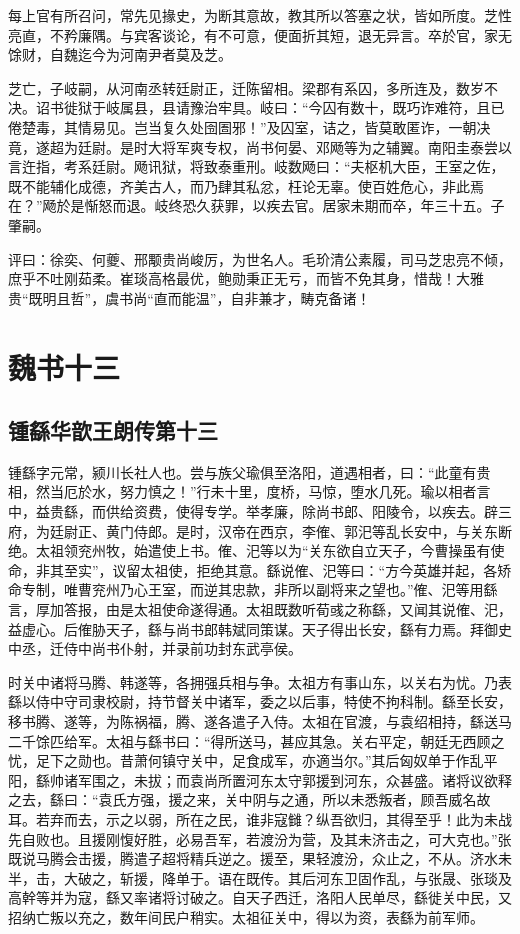 \documentclass[12pt,UTF8]{ctexbook}
\begin{document}
每上官有所召问，常先见掾史，为断其意故，教其所以答塞之状，皆如所度。芝性亮直，不矜廉隅。与宾客谈论，有不可意，便面折其短，退无异言。卒於官，家无馀财，自魏迄今为河南尹者莫及芝。

芝亡，子岐嗣，从河南丞转廷尉正，迁陈留相。梁郡有系囚，多所连及，数岁不决。诏书徙狱于岐属县，县请豫治牢具。岐曰：“今囚有数十，既巧诈难符，且已倦楚毒，其情易见。岂当复久处囹圄邪！”及囚室，诘之，皆莫敢匿诈，一朝决竟，遂超为廷尉。是时大将军爽专权，尚书何晏、邓飏等为之辅翼。南阳圭泰尝以言迕指，考系廷尉。飏讯狱，将致泰重刑。岐数飏曰：“夫枢机大臣，王室之佐，既不能辅化成德，齐美古人，而乃肆其私忿，枉论无辜。使百姓危心，非此焉在？”飏於是惭怒而退。岐终恐久获罪，以疾去官。居家未期而卒，年三十五。子肇嗣。

评曰：徐奕、何夔、邢颙贵尚峻厉，为世名人。毛玠清公素履，司马芝忠亮不倾，庶乎不吐刚茹柔。崔琰高格最优，鲍勋秉正无亏，而皆不免其身，惜哉！大雅贵“既明且哲”，虞书尚“直而能温”，自非兼才，畴克备诸！

\part{魏书十三}
\chapter{锺繇华歆王朗传第十三}

锺繇字元常，颍川长社人也。尝与族父瑜俱至洛阳，道遇相者，曰：“此童有贵相，然当厄於水，努力慎之！”行未十里，度桥，马惊，堕水几死。瑜以相者言中，益贵繇，而供给资费，使得专学。举孝廉，除尚书郎、阳陵令，以疾去。辟三府，为廷尉正、黄门侍郎。是时，汉帝在西京，李傕、郭汜等乱长安中，与关东断绝。太祖领兖州牧，始遣使上书。傕、汜等以为“关东欲自立天子，今曹操虽有使命，非其至实”，议留太祖使，拒绝其意。繇说傕、汜等曰：“方今英雄并起，各矫命专制，唯曹兖州乃心王室，而逆其忠款，非所以副将来之望也。”傕、汜等用繇言，厚加答报，由是太祖使命遂得通。太祖既数听荀彧之称繇，又闻其说傕、汜，益虚心。后傕胁天子，繇与尚书郎韩斌同策谋。天子得出长安，繇有力焉。拜御史中丞，迁侍中尚书仆射，并录前功封东武亭侯。

时关中诸将马腾、韩遂等，各拥强兵相与争。太祖方有事山东，以关右为忧。乃表繇以侍中守司隶校尉，持节督关中诸军，委之以后事，特使不拘科制。繇至长安，移书腾、遂等，为陈祸福，腾、遂各遣子入侍。太祖在官渡，与袁绍相持，繇送马二千馀匹给军。太祖与繇书曰：“得所送马，甚应其急。关右平定，朝廷无西顾之忧，足下之勋也。昔萧何镇守关中，足食成军，亦適当尔。”其后匈奴单于作乱平阳，繇帅诸军围之，未拔；而袁尚所置河东太守郭援到河东，众甚盛。诸将议欲释之去，繇曰：“袁氏方强，援之来，关中阴与之通，所以未悉叛者，顾吾威名故耳。若弃而去，示之以弱，所在之民，谁非寇雠？纵吾欲归，其得至乎！此为未战先自败也。且援刚愎好胜，必易吾军，若渡汾为营，及其未济击之，可大克也。”张既说马腾会击援，腾遣子超将精兵逆之。援至，果轻渡汾，众止之，不从。济水未半，击，大破之，斩援，降单于。语在既传。其后河东卫固作乱，与张晟、张琰及高幹等并为寇，繇又率诸将讨破之。自天子西迁，洛阳人民单尽，繇徙关中民，又招纳亡叛以充之，数年间民户稍实。太祖征关中，得以为资，表繇为前军师。
\end{document}
